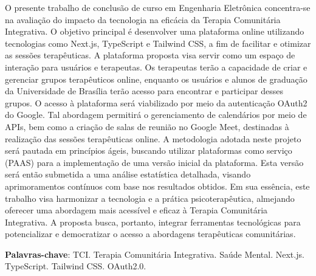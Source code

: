 \begin{resumo}
    O presente trabalho de conclusão de curso em Engenharia Eletrônica concentra-se na avaliação do impacto da tecnologia na eficácia da Terapia Comunitária Integrativa. O objetivo principal é desenvolver uma plataforma online utilizando tecnologias como Next.js, TypeScript e Tailwind CSS, a fim de facilitar e otimizar as sessões terapêuticas. A plataforma proposta visa servir como um espaço de interação para usuários e terapeutas. Os terapeutas terão a capacidade de criar e gerenciar grupos terapêuticos online, enquanto os usuários e alunos de graduação da Universidade de Brasília terão acesso para encontrar e participar desses grupos. O acesso à plataforma será viabilizado por meio da autenticação OAuth2 do Google. Tal abordagem permitirá o gerenciamento de calendários por meio de APIs, bem como a criação de salas de reunião no Google Meet, destinadas à realização das sessões terapêuticas online. A metodologia adotada neste projeto será pautada em princípios ágeis, buscando utilizar plataformas como serviço (PAAS) para a implementação de uma versão inicial da plataforma. Esta versão será então submetida a uma análise estatística detalhada, visando aprimoramentos contínuos com base nos resultados obtidos. Em sua essência, este trabalho visa harmonizar a tecnologia e a prática psicoterapêutica, almejando oferecer uma abordagem mais acessível e eficaz à Terapia Comunitária Integrativa. A proposta busca, portanto, integrar ferramentas tecnológicas para potencializar e democratizar o acesso a abordagens terapêuticas comunitárias.

 \vspace{\onelineskip}
    
 \noindent
 \textbf{Palavras-chave}: TCI. Terapia Comunitária Integrativa. Saúde Mental. Next.js. TypeScript. Tailwind CSS. OAuth2.0. 
\end{resumo}
